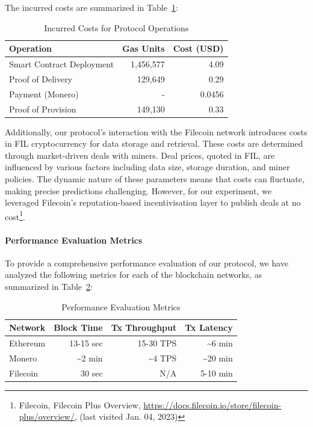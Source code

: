 \documentclass[pdftex,twocolumn,epjc3]{svjour3}
\begin{document}
The incurred costs are summarized in Table~\ref{table:costs}:

\begin{table}
\caption{Incurred Costs for Protocol Operations}
\centering
\label{table:costs}
\begin{tabular}{lrr}
\hline
\textbf{Operation}            & \textbf{Gas Units} & \textbf{Cost (USD)} \\
\hline
Smart Contract Deployment     & 1,456,577          & 4.09                \\
Proof of Delivery             & 129,649            & 0.29                \\
Payment (Monero)              & -                  & 0.0456              \\
Proof of Provision            & 149,130            & 0.33                \\
\hline
\end{tabular}
\end{table}

Additionally, our protocol's interaction with the Filecoin network introduces costs in FIL cryptocurrency for data storage and retrieval. These costs are determined through market-driven deals with miners. Deal prices, quoted in FIL, are influenced by various factors including data size, storage duration, and miner policies. The dynamic nature of these parameters means that costs can fluctuate, making precise predictions challenging. However, for our experiment, we leveraged Filecoin's reputation-based incentivisation layer to publish deals at no cost\footnote{Filecoin, Filecoin Plus Overview, \url{https://docs.filecoin.io/store/filecoin-plus/overview/}, (last visited Jan. 04, 2023)}.

\paragraph{Performance Evaluation Metrics}

To provide a comprehensive performance evaluation of our protocol, we have analyzed the following metrics for each of the blockchain networks, as summarized in Table~\ref{table:performance}:

\begin{table}[h!]
\centering
\caption{Performance Evaluation Metrics}
\label{table:performance}
\begin{tabular}{lrrr}
\hline
\textbf{Network}     & \textbf{Block Time} & \textbf{Tx Throughput} & \textbf{Tx Latency} \\ \hline
Ethereum             & 13-15 sec       & 15-30 TPS                       & \textasciitilde{}6 min      \\
Monero               & \textasciitilde{}2 min & \textasciitilde{}4 TPS             & \textasciitilde{}20 min \\
Filecoin             & 30 sec & N/A\footnotemark{}            & 5-10 min  \\ 
\hline
\end{tabular}
\end{table}
\end{document}
